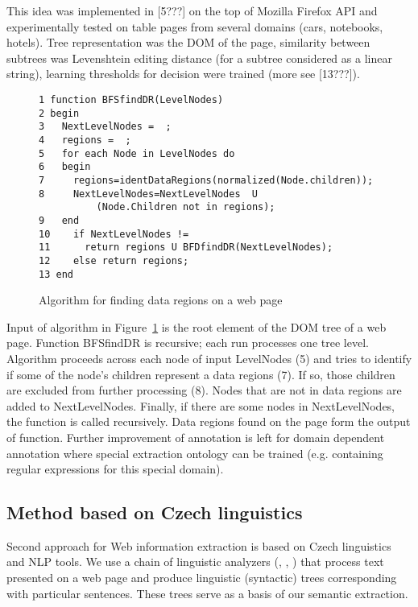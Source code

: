 \documentclass{sig-alternate}
\begin{document}
This idea was implemented in [5???] on the top of Mozilla Firefox API and experimentally tested on table pages from several domains (cars, notebooks, hotels). Tree representation was the DOM of the page, similarity between subtrees was Levenshtein editing distance (for a subtree considered as a linear string), learning thresholds for decision were trained (more see [13???]).

\begin{figure}
{\footnotesize\begin{verbatim}
1 function BFSfindDR(LevelNodes)
2 begin
3   NextLevelNodes =  ; 
4   regions =  ; 
5   for each Node in LevelNodes do 
6   begin 
7     regions=identDataRegions(normalized(Node.children)); 
8     NextLevelNodes=NextLevelNodes  U 
	      (Node.Children not in regions);         
9   end
10    if NextLevelNodes !=   
11      return regions U BFDfindDR(NextLevelNodes);
12    else return regions;
13 end
\end{verbatim}}
\caption{Algorithm for finding data regions on a web page}
\label{fig:alg}
\end{figure}

Input of algorithm in Figure~\ref{fig:alg} is the root element of the DOM tree of a web page. Function BFSfindDR is recursive; each run processes one tree level. Algorithm proceeds across each node of input LevelNodes (5) and tries to identify if some of the node's children represent a data regions (7). If so, those children are excluded from further processing (8). Nodes that are not in data regions are added to NextLevelNodes. Finally, if there are some nodes in NextLevelNodes, the function is called recursively. Data regions found on the page form the output of function.
Further improvement of annotation is left for domain dependent annotation where special extraction ontology can be trained (e.g. containing regular expressions for this special domain).

\subsection{Method based on Czech linguistics}
Second approach for Web information extraction is based on Czech linguistics and NLP tools. We use a chain of linguistic analyzers (\cite{biblio:HajicMorfTag}, \cite{biblio:collinshbrt_1999}, \cite{biblio:KlTransformationBasedTectogrammatical2006}) that process text presented on a web page and produce linguistic (syntactic) trees corresponding with particular sentences. These trees serve as a basis of our semantic extraction.
\end{document}
